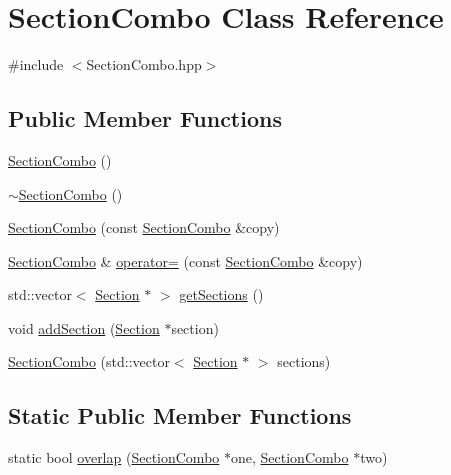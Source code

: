 \hypertarget{class_section_combo}{}\section{Section\+Combo Class Reference}
\label{class_section_combo}


{\ttfamily \#include $<$Section\+Combo.\+hpp$>$}

\subsection*{Public Member Functions}
\begin{DoxyCompactItemize}
\item 
\hyperlink{class_section_combo_add21fe503bba0f05ebbc24d63b4efd36}{Section\+Combo} ()
\item 
\hyperlink{class_section_combo_ab6d5f1c5654d2dbcc45ecda8f487d485}{$\sim$\+Section\+Combo} ()
\item 
\hyperlink{class_section_combo_a8c6a0b5a382c17eee76f30d333e47917}{Section\+Combo} (const \hyperlink{class_section_combo}{Section\+Combo} \&copy)
\item 
\hyperlink{class_section_combo}{Section\+Combo} \& \hyperlink{class_section_combo_a37318f5816212acfccfb92be52ea823c}{operator=} (const \hyperlink{class_section_combo}{Section\+Combo} \&copy)
\item 
std\+::vector$<$ \hyperlink{class_section}{Section} $\ast$ $>$ \hyperlink{class_section_combo_a98327f0cd8233c6dffcf51a45b9348d6}{get\+Sections} ()
\item 
void \hyperlink{class_section_combo_afabc79ef6fca3029fbe09fedfa206e4e}{add\+Section} (\hyperlink{class_section}{Section} $\ast$section)
\item 
\hyperlink{class_section_combo_af572424351bdb53fa93a7db113a4b324}{Section\+Combo} (std\+::vector$<$ \hyperlink{class_section}{Section} $\ast$ $>$ sections)
\end{DoxyCompactItemize}
\subsection*{Static Public Member Functions}
\begin{DoxyCompactItemize}
\item 
static bool \hyperlink{class_section_combo_a6aa4f05eb70c97debc6ce3a2048aff99}{overlap} (\hyperlink{class_section_combo}{Section\+Combo} $\ast$one, \hyperlink{class_section_combo}{Section\+Combo} $\ast$two)
\end{DoxyCompactItemize}

